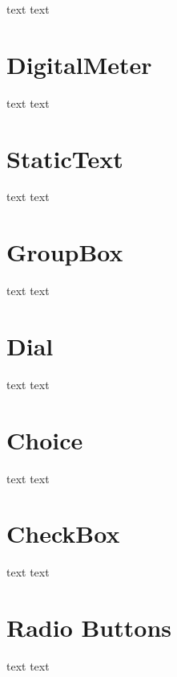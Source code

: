 text text\par
 \hypertarget{intro_widgets_digitalMeter}{}\section{Digital\-Meter}\label{intro_widgets_digitalMeter}
text text\par
 \hypertarget{intro_widgets_staticText}{}\section{Static\-Text}\label{intro_widgets_staticText}
text text\par
 \hypertarget{intro_widgets_groupBox}{}\section{Group\-Box}\label{intro_widgets_groupBox}
text text\par
 \hypertarget{intro_widgets_dial}{}\section{Dial}\label{intro_widgets_dial}
text text\par
 \hypertarget{intro_widgets_choice}{}\section{Choice}\label{intro_widgets_choice}
text text\par
 \hypertarget{intro_widgets_checkBox}{}\section{Check\-Box}\label{intro_widgets_checkBox}
text text\par
 \hypertarget{intro_widgets_radioButtons}{}\section{Radio Buttons}\label{intro_widgets_radioButtons}
text text\par
 